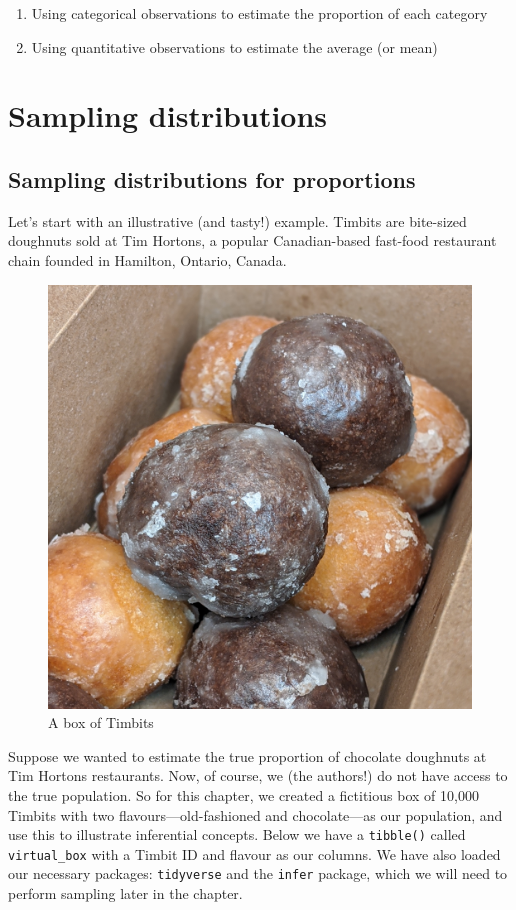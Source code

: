 \documentclass[
]{krantz}
\providecommand{\tightlist}{%
  \setlength{\itemsep}{0pt}\setlength{\parskip}{0pt}}
\begin{document}
\begin{enumerate}
\def\labelenumi{\arabic{enumi}.}
\tightlist
\item
  Using categorical observations to estimate the proportion of each category
\item
  Using quantitative observations to estimate the average (or mean)
\end{enumerate}

\hypertarget{sampling-distributions}{%
\section{Sampling distributions}\label{sampling-distributions}}

\hypertarget{sampling-distributions-for-proportions}{%
\subsection{Sampling distributions for proportions}\label{sampling-distributions-for-proportions}}

Let's start with an illustrative (and tasty!) example. Timbits are
bite-sized doughnuts sold at Tim Hortons, a popular Canadian-based fast-food restaurant
chain founded in Hamilton, Ontario, Canada.

\begin{figure}
\includegraphics[width=0.3\linewidth]{img/timbits} \caption{A box of Timbits}\label{fig:11-timbits-picture}
\end{figure}

Suppose we wanted to estimate the true proportion of chocolate doughnuts at Tim
Hortons restaurants. Now, of course, we (the authors!) do not have access to the true population.
So for this chapter, we created a fictitious box of 10,000 Timbits with two flavours---old-fashioned
and chocolate---as our population, and use this to illustrate
inferential concepts. Below we have a \texttt{tibble()} called \texttt{virtual\_box} with a Timbit ID and flavour as our columns. We have also loaded our necessary packages: \texttt{tidyverse} and the \texttt{infer} package, which we will need to perform sampling later in the chapter.
\end{document}
